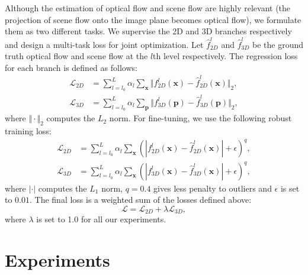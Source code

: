 \documentclass[10pt,twocolumn,letterpaper]{article}
\begin{document}
Although the estimation of optical flow and scene flow are highly relevant (the projection of scene flow onto the image plane becomes optical flow), we formulate them as two different tasks. We supervise the 2D and 3D branches respectively and design a multi-task loss for joint optimization. Let $\hat{f}_{2D}^l$ and $\hat{f}_{3D}^l$ be the ground truth optical flow and scene flow at the $l$th level respectively. The regression loss for each branch is defined as follows:
\begin{align}
    \mathcal{L}_{2D} &= \sum_{l=l_0}^{L} \alpha_l \sum_{\mathbf{x}} \Vert f_{2D}^l(\mathbf{x}) - \hat{f}_{2D}^l(\mathbf{x}) \Vert_2,\\
    \mathcal{L}_{3D} &= \sum_{l=l_0}^{L} \alpha_l \sum_{\mathbf{p}} \Vert f_{3D}^l(\mathbf{p}) - \hat{f}_{3D}^l(\mathbf{p}) \Vert_2,
\end{align}
where $\Vert \cdot \Vert_2$ computes the $L_2$ norm. For fine-tuning, we use the following robust training loss:
\begin{align}
    \mathcal{L}_{2D} &= \sum_{l=l_0}^{L} \alpha_l \sum_{\mathbf{x}} (| f_{2D}^l(\mathbf{x}) - \hat{f}_{2D}^l(\mathbf{x}) | + \epsilon)^q,\\
    \mathcal{L}_{3D} &= \sum_{l=l_0}^{L} \alpha_l \sum_{\mathbf{x}} (| f_{3D}^l(\mathbf{x}) - \hat{f}_{3D}^l(\mathbf{x}) | + \epsilon)^q,
\end{align}
where $| \cdot |$ computes the $L_1$ norm, $q=0.4$ gives less penalty to outliers and $\epsilon$ is set to $0.01$. The final loss is a weighted sum of the losses defined above:
\begin{equation}
    \mathcal{L} = \mathcal{L}_{2D} + \lambda \mathcal{L}_{3D},  
\end{equation}
where $\lambda$ is set to 1.0 for all our experiments.

\section{Experiments}
\end{document}
